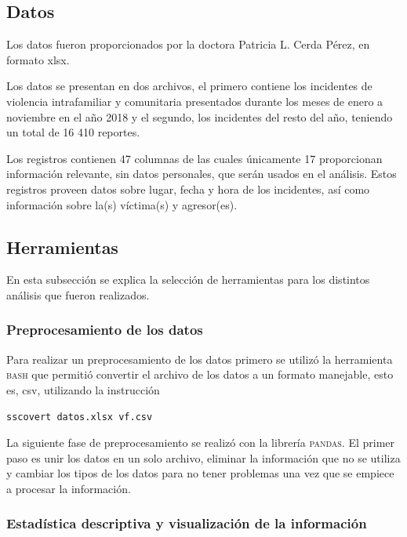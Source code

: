 \documentclass[final,5p,times]{elsarticle}
\begin{document}
\subsection{Datos}

Los datos fueron proporcionados por la doctora Patricia L. Cerda P\'erez, en formato xlsx.

Los datos se presentan en dos archivos, el primero contiene los incidentes de violencia intrafamiliar y comunitaria presentados durante los meses de enero a noviembre en el a\~no 2018 y el segundo, los incidentes del resto del a\~no, teniendo un total de 16 410 reportes. 

Los registros contienen 47 columnas de las cuales \'unicamente 17 proporcionan informaci\'on relevante, sin datos personales, que ser\'an usados en el an\'alisis. Estos registros proveen datos sobre lugar, fecha y hora de los incidentes, as\'i como informaci\'on sobre la(s) v\'ictima(s) y agresor(es).  

\subsection{Herramientas}

En esta subsecci\'on se explica la selecci\'on de herramientas para los distintos an\'alisis que fueron realizados.

\subsubsection*{Preprocesamiento de los datos} 
Para realizar un preprocesamiento de los datos primero se utiliz\'o la herramienta \textsc{bash} que permiti\'o convertir el archivo de los datos a un formato manejable, esto es, csv, utilizando la instrucci\'on
\begin{lstlisting}
sscovert datos.xlsx vf.csv
\end{lstlisting}

La siguiente fase de preprocesamiento se realiz\'o con la librer\'ia \textsc{pandas}. El primer paso es unir los datos en un solo archivo, eliminar la informaci\'on que no se utiliza y cambiar los tipos de los datos para no tener problemas una vez que se empiece a procesar la informaci\'on.

\subsubsection*{Estad\'istica descriptiva y visualizaci\'on de la informaci\'on}
\end{document}
